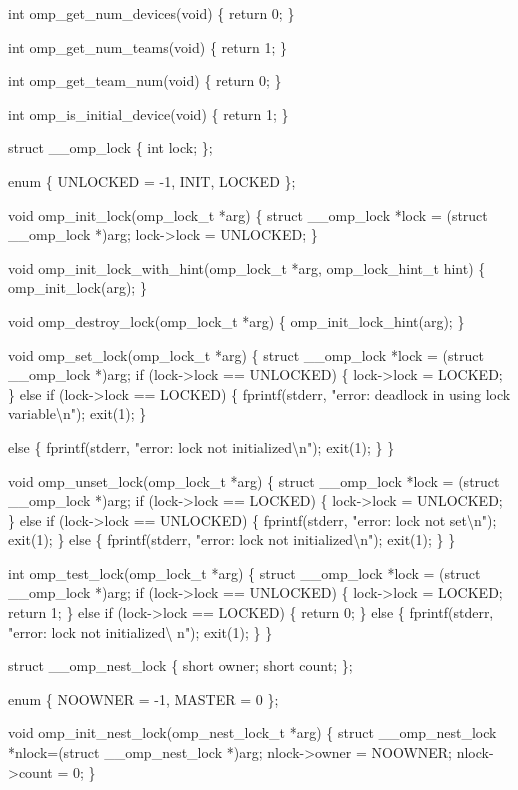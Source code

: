 {\begin{codepar}
int omp\_get\_num\_devices(void)
\{
    return 0;
\}

int omp\_get\_num\_teams(void)
\{
    return 1;
\}

int omp\_get\_team\_num(void)
\{
    return 0;
\}

int omp\_is\_initial\_device(void)
\{
return 1;
\}

struct \_\_omp\_lock
\{
    int lock;
\};

enum \{ UNLOCKED = -1, INIT, LOCKED \};

void omp\_init\_lock(omp\_lock\_t *arg)
\{
    struct \_\_omp\_lock *lock = (struct \_\_omp\_lock *)arg;
    lock->lock = UNLOCKED;
\}

void omp\_init\_lock\_with\_hint(omp\_lock\_t *arg, omp\_lock\_hint\_t hint)
\{
    omp\_init\_lock(arg);
\}

void omp\_destroy\_lock(omp\_lock\_t *arg)
\{
    omp\_init\_lock\_hint(arg);
\}

void omp\_set\_lock(omp\_lock\_t *arg)
\{
    struct \_\_omp\_lock *lock = (struct \_\_omp\_lock *)arg;
    if (lock->lock == UNLOCKED)
    \{
        lock->lock = LOCKED;
    \}
    else if (lock->lock == LOCKED)
    \{
        fprintf(stderr, "error: deadlock in using lock variable{\textbackslash}n");
        exit(1);
    \}

    else
    \{
        fprintf(stderr, "error: lock not initialized{\textbackslash}n");
        exit(1);
    \}
\}

void omp\_unset\_lock(omp\_lock\_t *arg)
\{
struct \_\_omp\_lock *lock = (struct \_\_omp\_lock *)arg;
    if (lock->lock == LOCKED)
    \{
        lock->lock = UNLOCKED;
    \}
    else if (lock->lock == UNLOCKED)
    \{
        fprintf(stderr, "error: lock not set{\textbackslash}n");
        exit(1);
    \}
    else
    \{
        fprintf(stderr, "error: lock not initialized{\textbackslash}n");
        exit(1);
    \}
\}

int omp\_test\_lock(omp\_lock\_t *arg)
\{
struct \_\_omp\_lock *lock = (struct \_\_omp\_lock *)arg;
    if (lock->lock == UNLOCKED)
    \{
        lock->lock = LOCKED;
        return 1;
    \}
    else if (lock->lock == LOCKED)
    \{
        return 0;
    \}
    else
    \{
        fprintf(stderr, "error: lock not initialized{\textbackslash} n");
        exit(1);
    \}
\}

struct \_\_omp\_nest\_lock
\{
    short owner;
    short count;
\};

enum \{ NOOWNER = -1, MASTER = 0 \};

void omp\_init\_nest\_lock(omp\_nest\_lock\_t *arg)
\{
    struct \_\_omp\_nest\_lock *nlock=(struct \_\_omp\_nest\_lock *)arg;
    nlock->owner = NOOWNER;
    nlock->count = 0;
\}


\end{codepar}}
